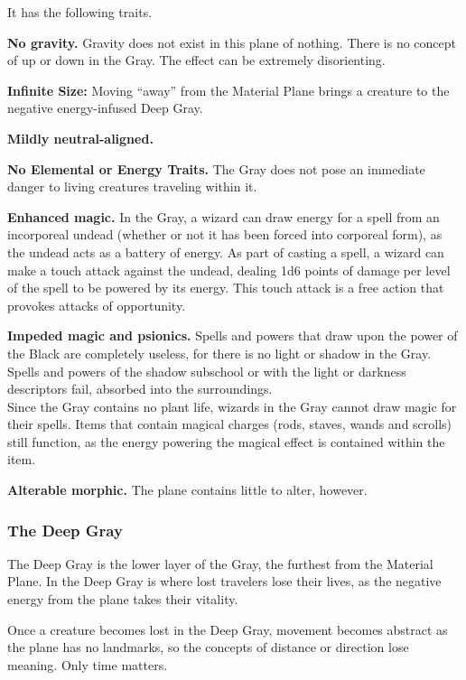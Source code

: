 It has the following traits.
\begin{itemize*}
\item \textbf{No gravity.} Gravity does not exist in this plane of nothing. There is no concept of up or down in the Gray. The effect can be extremely disorienting.
\item \textbf{Infinite Size:} Moving ``away'' from the Material Plane brings a creature to the negative energy-infused Deep Gray.
\item \textbf{Mildly neutral-aligned.}
\item \textbf{No Elemental or Energy Traits.} The Gray does not pose an immediate danger to living creatures traveling within it.
\item \textbf{Enhanced magic.} In the Gray, a wizard can draw energy for a spell from an incorporeal undead (whether or not it has been forced into corporeal form), as the undead acts as a battery of energy. As part of casting a spell, a wizard can make a touch attack against the undead, dealing 1d6 points of damage per level of the spell to be powered by its energy. This touch attack is a free action that provokes attacks of opportunity.
\item \textbf{Impeded magic and psionics.} Spells and powers that draw upon the power of the Black are completely useless, for there is no light or shadow in the Gray. Spells and powers of the shadow subschool or with the light or darkness descriptors fail, absorbed into the surroundings.\\

Since the Gray contains no plant life, wizards in the Gray cannot draw magic for their spells. Items that contain magical charges (rods, staves, wands and scrolls) still function, as the energy powering the magical effect is contained within the item.
\item \textbf{Alterable morphic.} The plane contains little to alter, however.
\end{itemize*}

\subsubsection{The Deep Gray}
The Deep Gray is the lower layer of the Gray, the furthest from the Material Plane. In the Deep Gray is where lost travelers lose their lives, as the negative energy from the plane takes their vitality.

Once a creature becomes lost in the Deep Gray, movement becomes abstract as the plane has no landmarks, so the concepts of distance or direction lose meaning. Only time matters.

